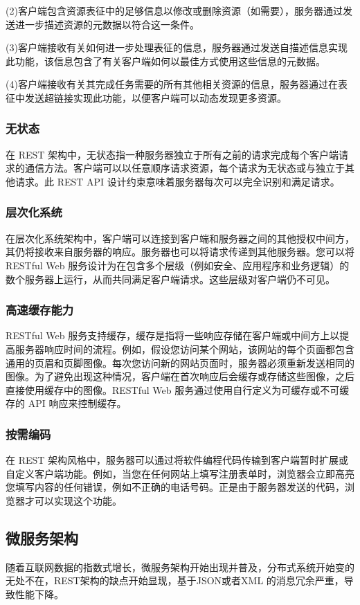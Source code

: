 \documentclass[a4paper,twoside]{scrbook}
\begin{document}
\begin{CJK}{UTF8}{gbsn}
(2)客户端包含资源表征中的足够信息以修改或删除资源（如需要），服务器通过发送进一步描述资源的元数据以符合这一条件。

(3)客户端接收有关如何进一步处理表征的信息，服务器通过发送自描述信息实现此功能，该信息包含了有关客户端如何以最佳方式使用这些信息的元数据。

(4)客户端接收有关其完成任务需要的所有其他相关资源的信息，服务器通过在表征中发送超链接实现此功能，以便客户端可以动态发现更多资源。
\subsubsection{无状态}
在 REST 架构中，无状态指一种服务器独立于所有之前的请求完成每个客户端请求的通信方法。客户端可以以任意顺序请求资源，每个请求为无状态或与独立于其他请求。此 REST API 设计约束意味着服务器每次可以完全识别和满足请求。 
\subsubsection{层次化系统}
在层次化系统架构中，客户端可以连接到客户端和服务器之间的其他授权中间方，其仍将接收来自服务器的响应。服务器也可以将请求传递到其他服务器。您可以将 RESTful Web 服务设计为在包含多个层级（例如安全、应用程序和业务逻辑）的数个服务器上运行，从而共同满足客户端请求。这些层级对客户端仍不可见。
\subsubsection{高速缓存能力}
RESTful Web 服务支持缓存，缓存是指将一些响应存储在客户端或中间方上以提高服务器响应时间的流程。例如，假设您访问某个网站，该网站的每个页面都包含通用的页眉和页脚图像。每次您访问新的网站页面时，服务器必须重新发送相同的图像。为了避免出现这种情况，客户端在首次响应后会缓存或存储这些图像，之后直接使用缓存中的图像。RESTful Web 服务通过使用自行定义为可缓存或不可缓存的 API 响应来控制缓存。
\subsubsection{按需编码}
在 REST 架构风格中，服务器可以通过将软件编程代码传输到客户端暂时扩展或自定义客户端功能。例如，当您在任何网站上填写注册表单时，浏览器会立即高亮您填写内容的任何错误，例如不正确的电话号码。正是由于服务器发送的代码，浏览器才可以实现这个功能。
\subsection{微服务架构}
随着互联网数据的指数式增长，微服务架构开始出现并普及，分布式系统开始变的无处不在，REST架构的缺点开始显现，基于JSON或者XML 的消息冗余严重，导致性能下降。


\end{CJK}
\end{document}
